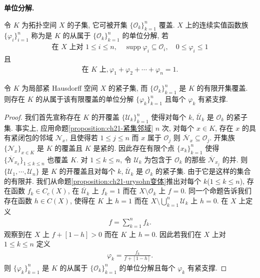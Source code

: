 \documentclass[../../main.tex]{subfiles}
\begin{document}
\textbf{单位分解.}

\begin{definition}[单位分解]\label{definition:ch21-单位分解}
令 $K$ 为拓扑空间 $X$ 的子集, 它可被开集 $\{\mathcal{O}_{k}\}_{k=1}^{n}$ 覆盖. $X$ 上的连续实值函数族 $\{\varphi_{i}\}_{i=1}^{n}$ 称为是 $K$ 的从属于 $\{\mathcal{O}_{k}\}_{k=1}^{n}$ 的单位分解, 若
\begin{align*}
\text{在 }X\text{ 上对 }1\leqslant i\leqslant n,\quad\operatorname{supp}\varphi_{i}\subseteq\mathcal{O}_{i},\quad 0\leqslant\varphi_{i}\leqslant 1
\end{align*}
且
\begin{align*}
\text{在 }K\text{ 上},\varphi_{1}+\varphi_{2}+\cdots+\varphi_{n}=1.
\end{align*}
\end{definition}

\begin{proposition}\label{proposition:ch21-单位分解存在}
令 $K$ 为局部紧 Hausdorff 空间 $X$ 的紧子集, 而 $\{\mathcal{O}_{k}\}_{k=1}^{n}$ 是 $K$ 的有限开集覆盖. 则存在 $K$ 的从属于该有限覆盖的单位分解 $\{\varphi_{k}\}_{k=1}^{n}$ 且每个 $\varphi_{k}$ 有紧支撑.
\end{proposition}

\begin{proof}
我们首先宣称存在 $K$ 的开覆盖 $\{\mathcal{U}_{k}\}_{k=1}^{n}$ 使得对每个 $k$, $\overline{\mathcal{U}}_{k}$ 是 $\mathcal{O}_{k}$ 的紧子集. 事实上, 应用命题\cref{proposition:ch21-紧集邻域} $n$ 次, 对每个 $x\in K$, 存在 $x$ 的具有紧闭包的邻域 $\mathcal{N}_{x}$, 且使得若 $1\leqslant j\leqslant n$ 而 $x$ 属于 $\mathcal{O}_{j}$ 则 $\overline{\mathcal{N}}_{x}\subseteq\mathcal{O}_{j}$. 开集族 $\{\mathcal{N}_{x}\}_{x\in K}$ 是 $K$ 的覆盖且 $K$ 是紧的. 因此存在有限个点 $\{x_{k}\}_{k=1}^{n}$ 使得 $\{\overline{\mathcal{N}}_{x_{k}}\}_{1\leqslant k\leqslant n}$ 也覆盖 $K$. 对 $1\leqslant k\leqslant n$, 令 $\mathcal{U}_{k}$ 为包含于 $\mathcal{O}_{k}$ 的那些 $\overline{\mathcal{N}}_{x_{j}}$ 的并. 则 $\{\mathcal{U}_{1},\cdots,\mathcal{U}_{n}\}$ 是 $K$ 的开覆盖且对每个 $k$, $\overline{\mathcal{U}}_{k}$ 是 $\mathcal{O}_{k}$ 的紧子集. 由于它是这样的集合的有限并. 我们从命题\cref{proposition:ch21-urysohn变体}推出对每个 $k$($1\leqslant k\leqslant n$), 存在函数 $f_{k}\in C_{c}(X)$, 在 $\overline{\mathcal{U}}_{k}$ 上 $f_{k}=1$ 而在 $X\setminus\mathcal{O}_{k}$ 上 $f=0$. 同一个命题告诉我们存在函数 $h\in C(X)$, 使得在 $K$ 上 $h=1$ 而在 $X\setminus\bigcup_{k=1}^{n}\mathcal{U}_{k}$ 上 $h=0$. 在 $X$ 上定义
\begin{align*}
f=\sum_{k=1}^{n}f_{k}.
\end{align*}
观察到在 $X$ 上 $f+[1-h]>0$ 而在 $K$ 上 $h=0$. 因此若我们在 $X$ 上对 $1\leqslant k\leqslant n$ 定义
\begin{align*}
\varphi_{k}=\frac{f_{k}}{f+[1-h]}.
\end{align*}
则 $\{\varphi_{k}\}_{k=1}^{n}$ 是 $K$ 的从属于 $\{\mathcal{O}_{k}\}_{k=1}^{n}$ 的单位分解且每个 $\varphi_{k}$ 有紧支撑.
\end{proof}
\end{document}
